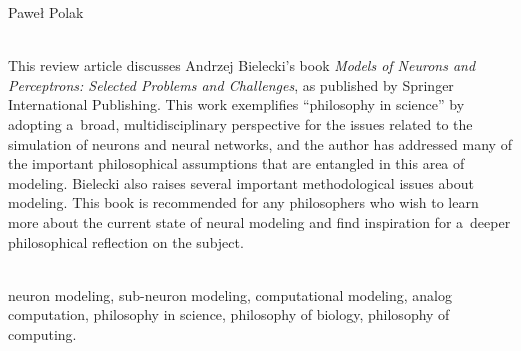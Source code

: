 \begin{newrevengenv}{Paweł Polak}
%


\vspace{15mm}%
{}\\
{This review article discusses Andrzej Bielecki's book \textit{Models of Neurons and Perceptrons: Selected Problems and Challenges}, as published by Springer International Publishing. This work exemplifies ``philosophy in science'' by adopting a~broad, multidisciplinary perspective for the issues related to the simulation of neurons and neural networks, and the author has addressed many of the important philosophical assumptions that are entangled in this area of modeling. Bielecki also raises several important methodological issues about modeling. This book is recommended for any philosophers who wish to learn more about the current state of neural modeling and find inspiration for a~deeper philosophical reflection on the subject.}\par%
\vspace{2mm}%
{}\\
{neuron modeling, sub-neuron modeling, computational modeling, analog computation, philosophy in science, philosophy of biology, philosophy of computing.}%



\end{newrevengenv}
